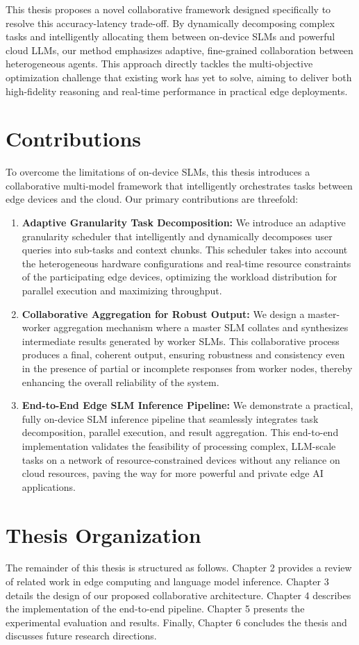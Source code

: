 This thesis proposes a novel collaborative framework designed specifically to resolve this accuracy-latency trade-off. By dynamically decomposing complex tasks and intelligently allocating them between on-device SLMs and powerful cloud LLMs, our method emphasizes adaptive, fine-grained collaboration between heterogeneous agents. This approach directly tackles the multi-objective optimization challenge that existing work has yet to solve, aiming to deliver both high-fidelity reasoning and real-time performance in practical edge deployments.

\section{Contributions}
To overcome the limitations of on-device SLMs, this thesis introduces a collaborative multi-model framework that intelligently orchestrates tasks between edge devices and the cloud. Our primary contributions are threefold:

\begin{enumerate}
    \item \textbf{Adaptive Granularity Task Decomposition:} We introduce an adaptive granularity scheduler that intelligently and dynamically decomposes user queries into sub-tasks and context chunks. This scheduler takes into account the heterogeneous hardware configurations and real-time resource constraints of the participating edge devices, optimizing the workload distribution for parallel execution and maximizing throughput.

    \item \textbf{Collaborative Aggregation for Robust Output:} We design a master-worker aggregation mechanism where a master SLM collates and synthesizes intermediate results generated by worker SLMs. This collaborative process produces a final, coherent output, ensuring robustness and consistency even in the presence of partial or incomplete responses from worker nodes, thereby enhancing the overall reliability of the system.

    \item \textbf{End-to-End Edge SLM Inference Pipeline:} We demonstrate a practical, fully on-device SLM inference pipeline that seamlessly integrates task decomposition, parallel execution, and result aggregation. This end-to-end implementation validates the feasibility of processing complex, LLM-scale tasks on a network of resource-constrained devices without any reliance on cloud resources, paving the way for more powerful and private edge AI applications.
\end{enumerate}

\section{Thesis Organization}
The remainder of this thesis is structured as follows. Chapter 2 provides a review of related work in edge computing and language model inference. Chapter 3 details the design of our proposed collaborative architecture. Chapter 4 describes the implementation of the end-to-end pipeline. Chapter 5 presents the experimental evaluation and results. Finally, Chapter 6 concludes the thesis and discusses future research directions.